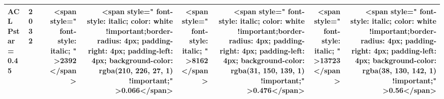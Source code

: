 \begin{table}
\begin{tabular}[t]{>{}l|l>{}rr>{}r|rrrr}
\multirow{-12}{*}{\raggedright\arraybackslash \textbf{ACL Pstar = 0.45}} & 2032 & \cellcolor[HTML]{6E6F73}{\textcolor{white}{3307}} & <span style="  font-style: italic;   " >2392</span> & <span style="  font-style: italic;   color: white !important;border-radius: 4px; padding-right: 4px; padding-left: 4px; background-color: rgba(210, 226, 27, 1) !important;" >0.066</span> & <span style="  font-style: italic;   " >8162</span> & <span style="  font-style: italic;   color: white !important;border-radius: 4px; padding-right: 4px; padding-left: 4px; background-color: rgba(31, 150, 139, 1) !important;" >0.476</span> & <span style="  font-style: italic;   " >13723</span> & <span style="  font-style: italic;   color: white !important;border-radius: 4px; padding-right: 4px; padding-left: 4px; background-color: rgba(38, 130, 142, 1) !important;" >0.56</span>\\
\bottomrule
\end{tabular}
\end{table}
